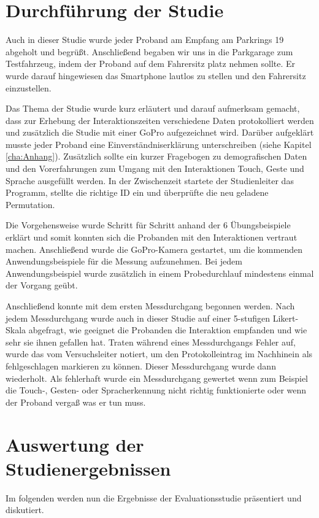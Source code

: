 \section[Durchführung der Studie]{Durchführung der Studie}
Auch in dieser Studie wurde jeder Proband am Empfang am Parkrings 19 abgeholt und begrüßt.
Anschließend begaben wir uns in die Parkgarage zum Testfahrzeug, indem der Proband auf dem Fahrersitz platz nehmen sollte.
Er wurde darauf hingewiesen das Smartphone lautlos zu stellen und den Fahrersitz einzustellen.

Das Thema der Studie wurde kurz erläutert und darauf aufmerksam gemacht, dass zur Erhebung der Interaktionszeiten verschiedene Daten protokolliert werden und zusätzlich die Studie mit einer GoPro aufgezeichnet wird.
Darüber aufgeklärt musste jeder Proband eine Einverständniserklärung unterschreiben (siehe Kapitel \ref{cha:Anhang}).
Zusätzlich sollte ein kurzer Fragebogen zu demografischen Daten und den Vorerfahrungen zum Umgang mit den Interaktionen Touch, Geste und Sprache ausgefüllt werden.
In der Zwischenzeit startete der Studienleiter das Programm, stellte die richtige ID ein und überprüfte die neu geladene Permutation.

Die Vorgehensweise wurde Schritt für Schritt anhand der 6 Übungsbeispiele erklärt und somit konnten sich die Probanden mit den Interaktionen vertraut machen. 
Anschließend wurde die GoPro-Kamera gestartet, um die kommenden Anwendungsbeispiele für die Messung aufzunehmen.
Bei jedem Anwendungsbeispiel wurde zusätzlich in einem Probedurchlauf mindestens einmal der Vorgang geübt. 

Anschließend konnte mit dem ersten Messdurchgang begonnen werden. 
Nach jedem Messdurchgang wurde auch in dieser Studie auf einer 5-stufigen Likert-Skala abgefragt, wie geeignet die Probanden die Interaktion empfanden und wie sehr sie ihnen gefallen hat.
Traten während eines Messdurchgangs Fehler auf, wurde das vom Versuchsleiter notiert, um den Protokolleintrag im Nachhinein als fehlgeschlagen markieren zu können. 
Dieser Messdurchgang wurde dann wiederholt. 
Als fehlerhaft wurde ein Messdurchgang gewertet wenn zum Beispiel die Touch-, Gesten- oder Spracherkennung nicht richtig funktionierte oder wenn der Proband vergaß was er tun muss. 

\section[Auswertung der Studienergebnissen]{Auswertung der Studienergebnissen}
Im folgenden werden nun die Ergebnisse der Evaluationsstudie präsentiert und diskutiert. 


